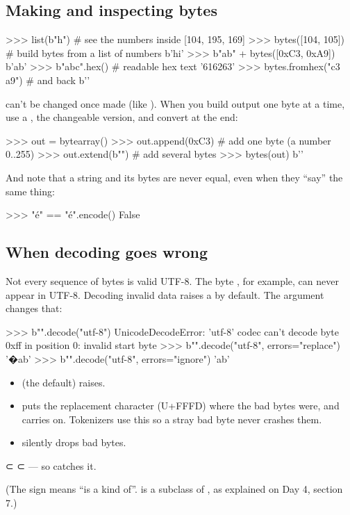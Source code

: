 \documentclass[10pt,a4paper]{article}
\begin{document}
\subsection{Making and inspecting bytes}
\begin{txtcode}
>>> list(b"h")        # see the numbers inside
[104, 195, 169]
>>> bytes([104, 105])         # build bytes from a list of numbers
b'hi'
>>> b"ab" + bytes([0xC3, 0xA9])
b'ab'
>>> b"abc".hex()              # readable hex text
'616263'
>>> bytes.fromhex("c3 a9")    # and back
b''
\end{txtcode}
 can’t be changed once made (like ). When you build output one byte at a time, use a \textbf{}, the changeable version, and convert at the end:
\begin{txtcode}
>>> out = bytearray()
>>> out.append(0xC3)          # add one byte (a number 0..255)
>>> out.extend(b"")       # add several bytes
>>> bytes(out)
b''
\end{txtcode}
And note that a string and its bytes are never equal, even when they “say” the same thing:
\begin{txtcode}
>>> "é" == "é".encode()
False
\end{txtcode}
\subsection{When decoding goes wrong}
Not every sequence of bytes is valid UTF-8. The byte , for example, can never appear in UTF-8. Decoding invalid data raises a  by default. The  argument changes that:
\begin{utfcode}
>>> b"\xff".decode("utf-8")
UnicodeDecodeError: 'utf-8' codec can't decode byte 0xff in position 0: invalid start byte
>>> b"\xffab".decode("utf-8", errors="replace")
'�ab'
>>> b"\xffab".decode("utf-8", errors="ignore")
'ab'
\end{utfcode}
\begin{itemize}
\item {} (the default) raises.
\item {} puts the replacement character  (U+FFFD) where the bad bytes were, and carries on. Tokenizers use this so a stray bad byte never crashes them.
\item {} silently drops bad bytes.
\end{itemize}
\begin{notebox}
 ⊂  ⊂  — so  catches it.
\end{notebox}
(The  sign means “is a kind of”.  is a subclass of , as explained on Day 4, section 7.)
\end{document}

